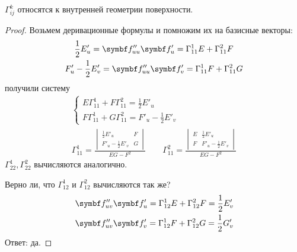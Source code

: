 \documentclass[main]{subfiles}
\begin{document}
\begin{theorem}
    $\Gamma^k_{ij}$ относятся к внутренней геометрии поверхности.
\end{theorem}
\begin{proof}
    Возьмем деривационные формулы и помножим их на базисные векторы:
    \begin{gather*}
        \frac{1}{2} E'_u = \vf''_{uu}\vf'_u = \Gamma^1_{11} E + \Gamma^2_{11} F\\
        F'_u - \frac{1}{2} E'_v = \vf''_{uu}\vf'_v = \Gamma^1_{11} F + \Gamma^2_{11} G
    \end{gather*}
    получили систему
    \begin{gather*}
        \begin{cases}
            E \Gamma^1_{11} + F \Gamma^2_{11} = \frac{1}{2}E'_u \\
            F \Gamma^1_{11} + G \Gamma^2_{11} = F'_u - \frac{1}{2} E'_v
        \end{cases}\\
        \Gamma^1_{11} = \frac{\begin{vmatrix}
                \frac{1}{2} E'_u       & F \\
                F'_u - \frac{1}{2}E'_v & G
            \end{vmatrix}}{EG - F^2} \qquad
        \Gamma^2_{11} = \frac{\begin{vmatrix}
                E & \frac{1}{2} E'_u       \\
                F & F'_u - \frac{1}{2}E'_v
            \end{vmatrix}}{EG - F^2}
    \end{gather*}
    $\Gamma^1_{22}, \Gamma^2_{22}$ вычисляются аналогично.

    Верно ли, что $\Gamma^1_{12}$ и $\Gamma^2_{12}$ вычисляются так же?
    \begin{gather*}
        \vf''_{uv} \vf'_u =\Gamma^1_{12} E + \Gamma^2_{12} F = \frac{1}{2} E'_v\\
        \vf''_{uv} \vf'_v =\Gamma^1_{12} F + \Gamma^2_{12} G = \frac{1}{2} G'_v
    \end{gather*}
    Ответ: да.
\end{proof}
\end{document}
